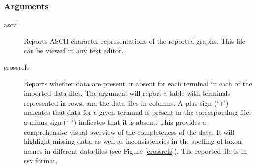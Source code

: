 	\subsubsection{Arguments}
	\begin{description}
		

		\item[ascii] Reports ASCII character representations of the reported graphs.
		This file can be viewed in any text editor.
		

		
		\item[crossrefs] Reports whether data are present or absent for each terminal 
		in each of the imported data files. The argument will report a table with terminals 
		represented in rows, and the data files in columns. A plus sign (`+') indicates that 
		data for a given terminal is present in the corresponding file; a minus sign (`--') 
		indicates that it is absent. This provides a comprehensive visual overview of the 
		completeness of the data. It will highlight missing data, as well as inconsistencies 
		in the spelling of taxon names in different data files (see Figure \ref{crossrefs}).  
		The reported file is in csv format.
		

\end{description}
